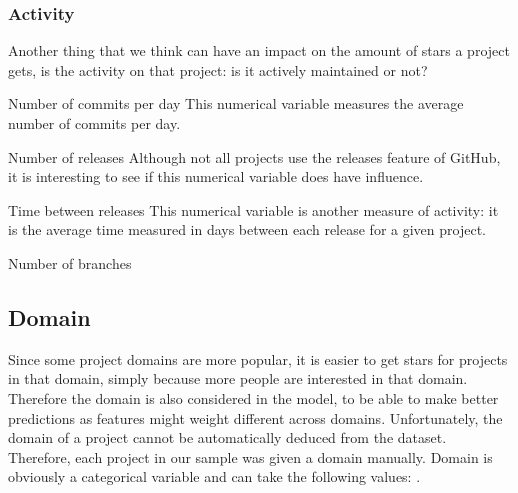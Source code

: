     \subsubsection{Activity}
        Another thing that we think can have an impact on the amount of stars a project gets, is the activity on that project: is it actively maintained or not?
    \begin{LaTeXdescription}
        \item[Number of commits per day]
            This numerical variable measures the average number of commits per day.
        \item[Number of releases]
            Although not all projects use the releases feature of GitHub, it is interesting to see if this numerical variable does have influence.
        \item[Time between releases]
            This numerical variable is another measure of activity: it is the average time measured in days between each release for a given project.
        \item[Number of branches]         
    \end{LaTeXdescription}


 
    \subsection{Domain}
        Since some project domains are more popular, it is easier to get stars for projects in that domain, simply because more people are interested in that domain.
        Therefore the domain is also considered in the model, to be able to make better predictions as features might weight different across domains.
        Unfortunately, the domain of a project cannot be automatically deduced from the dataset. 
        Therefore, each project in our sample was given a domain manually. Domain is obviously a categorical variable and can take the following values: .

    
